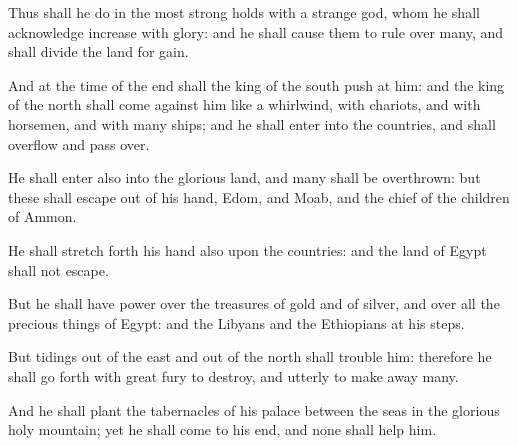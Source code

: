 {Thus shall he
do in the most
strong
holds with a
strange
god, whom he shall
acknowledge
{}
increase with
glory: and he shall cause them to
rule over
many, and shall
divide the
land for
gain.

And at the
time of the
end shall the
king of the
south
push at him: and the
king of the
north shall come against him like a
whirlwind, with
chariots, and with
horsemen, and with
many
ships; and he shall
enter into the
countries, and shall
overflow and pass
over.

He shall
enter also into the
glorious
land, and
many
{} shall be
overthrown: but these shall
escape out of his
hand,
{}
Edom, and
Moab, and the
chief of the
children of
Ammon.

He shall stretch
forth his
hand also upon the
countries: and the
land of
Egypt shall not
escape.

But he shall have
power over the
treasures of
gold and of
silver, and over all the
precious things of
Egypt: and the
Libyans and the
Ethiopians
{} at his
steps.

But
tidings out of the
east and out of the
north shall
trouble him: therefore he shall go
forth with
great
fury to
destroy, and utterly to make
away
many.

And he shall
plant the
tabernacles of his
palace between the
seas in the
glorious
holy
mountain; yet he shall
come to his
end, and none shall
help him.




\par }
